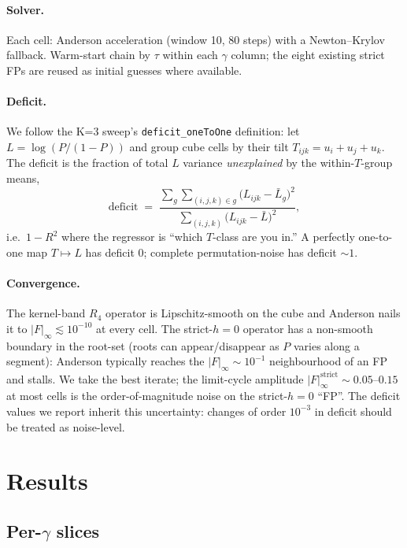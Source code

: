 \documentclass[11pt]{article}
\begin{document}
\paragraph{Solver.}
Each cell: Anderson acceleration (window 10, 80 steps) with a Newton--Krylov
fallback. Warm-start chain by $\tau$ within each $\gamma$ column; the eight
existing strict FPs are reused as initial guesses where available.

\paragraph{Deficit.}
We follow the K=3 sweep's
\texttt{deficit\_oneToOne} definition: let
$L = \log(P / (1{-}P))$ and group cube cells by their tilt
$T_{ijk}=u_i+u_j+u_k$. The deficit is the fraction of total $L$ variance
\emph{unexplained} by the within-$T$-group means,
\[
  \mathrm{deficit}
  \;=\;
  \frac{\sum_g \sum_{(i,j,k)\in g}\bigl(L_{ijk}-\bar L_g\bigr)^2}
       {\sum_{(i,j,k)}\bigl(L_{ijk}-\bar L\bigr)^2},
\]
i.e.\ $1-R^2$ where the regressor is ``which $T$-class are you in.''
A perfectly one-to-one map $T\mapsto L$ has deficit $0$; complete
permutation-noise has deficit $\sim 1$.

\paragraph{Convergence.}
The kernel-band $R_4$ operator is Lipschitz-smooth on the cube and
Anderson nails it to $|F|_\infty\!\lesssim\!10^{-10}$ at every cell.
The strict-$h{=}0$ operator has a non-smooth boundary in the root-set
(roots can appear/disappear as $P$ varies along a segment): Anderson
typically reaches the $|F|_\infty\!\sim\!10^{-1}$ neighbourhood of an FP
and stalls. We take the best iterate; the limit-cycle amplitude
$|F|_\infty^{\mathrm{strict}}\!\sim\!0.05$--$0.15$ at most cells is the
order-of-magnitude noise on the strict-$h{=}0$ ``FP''. The deficit values
we report inherit this uncertainty: changes of order $10^{-3}$ in deficit
should be treated as noise-level.

\section{Results}

\subsection{Per-$\gamma$ slices}
\end{document}
